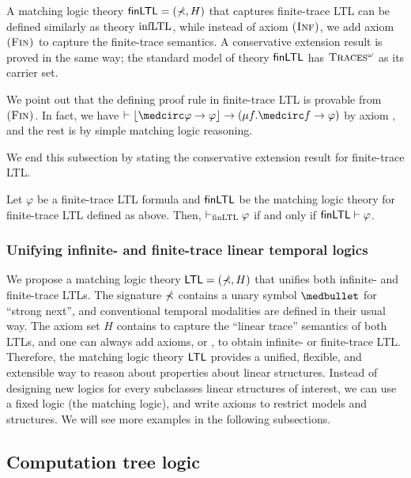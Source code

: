 \documentclass{amsart}
\begin{document}
A matching logic theory $\mathsf{finLTL} = (\mathbb{\Sigma}, H)$ that captures finite-trace LTL
can be defined similarly as theory $\mathrm{infLTL}$,
while instead of axiom $\textsc{(Inf)}$, we add axiom $\textsc{(Fin)}$ to capture the finite-trace semantics.
A conservative extension result is proved in the same way;
the standard model of theory $\mathsf{finLTL}$ has $\textsc{Traces$^\omega$}$ as its carrier set.

We point out that the defining proof rule  in finite-trace LTL
is provable from $\textsc{(Fin)}$.
In fact, we have 
$\vdash \floor{\wnext \varphi \imp \varphi} \imp (\mu f . \wnext f \imp \varphi)$
by axiom \Lfp,
and the rest is by simple matching logic reasoning.

We end this subsection by stating the conservative extension result for
finite-trace LTL.

\begin{theorem}
\label{thm_csrvext_finLTL}
Let  $\varphi$ be a finite-trace LTL formula
and $\mathsf{finLTL}$ be the matching logic theory for finite-trace LTL defined as above.
Then,  $\vdash_{\mathrm{finLTL}} \varphi$ if and only if
$\mathsf{finLTL} \vdash \varphi$.
\end{theorem}

\subsubsection{Unifying infinite- and finite-trace linear temporal logics}

We propose a matching logic theory $\mathsf{LTL} = (\mathbb{\Sigma}, H)$ that unifies both
infinite- and finite-trace LTLs.
The signature $\mathbb{\Sigma}$ contains a unary symbol $\snext$ for ``strong next'',
and conventional temporal modalities are defined in their usual way.
The axiom set $H$ contains \Lin to capture the ``linear trace'' semantics
of both LTLs, and one can always add axioms, \Inf or \Fin, to obtain
infinite- or finite-trace LTL.
Therefore, the matching logic theory $\mathsf{LTL}$ provides a unified, flexible, and extensible
way to reason about properties about linear structures.
Instead of designing new logics for every subclasses linear structures of interest, 
we can use a fixed logic (the matching logic), and 
write axioms to restrict models and structures.
We will see more examples in the following subsections.

\subsection{Computation tree logic}
\label{sec_CTL}
\end{document}
